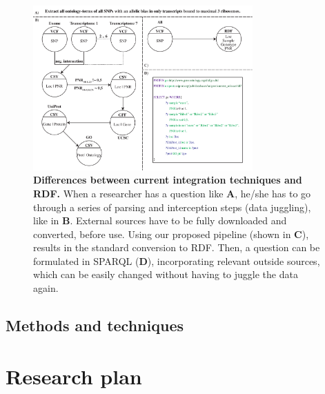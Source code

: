 \documentclass[twoside,fontsize=10pt]{article}
\begin{document}
\begin{figure}[H]
    \centering
    \includegraphics[width=0.75\textwidth]{DifferencesInDoingThings}
    \caption{\textbf{Differences between current integration techniques and RDF.} When a researcher has a question like \textbf{A}, he/she has to go through a series of parsing and interception steps (data juggling), like in \textbf{B}. External sources have to be fully downloaded and converted, before use. Using our proposed pipeline (shown in \textbf{C}), results in the standard conversion to RDF. Then, a question can be formulated in SPARQL (\textbf{D}), incorporating relevant outside sources, which can be easily changed without having to juggle the data again.}
    \label{fig:awesome_image}
\end{figure}
\subsection*{Methods and techniques} %
\section*{Research plan}
\end{document}
